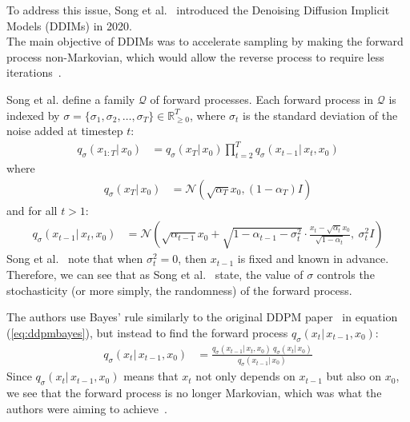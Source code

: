 \documentclass[twoside]{article}
\numberwithin{equation}{section}
\numberwithin{figure}{section}
\begin{document}
To address this issue, Song et al.~\cite{song2022denoising} introduced the Denoising Diffusion Implicit Models (DDIMs) in 2020. \\
The main objective of DDIMs was to accelerate sampling by making the forward process non-Markovian, which would allow the reverse process to require less iterations~\cite{song2022denoising}.

Song et al. \cite{song2022denoising} define a family $\mathcal{Q}$ of forward processes. Each forward process in $\mathcal{Q}$ is indexed by $\sigma  = \{ \sigma_1, \sigma_2, \ldots, \sigma_T \} \in \mathbb{R}^T_{\geq 0}$, where $\sigma_t$ is the standard deviation of the noise added at timestep $t$:
\begin{align}
  q_{\sigma}(x_{1:T}| \, x_0) &= q_{\sigma}(x_T | \, x_0) \prod_{t=2}^{T} q_{\sigma}(x_{t-1}| \, x_t, x_0)
\end{align}
where
\begin{align}
  q_{\sigma}(x_T | \, x_0) &= \mathcal{N}(\sqrt{\alpha_T} x_0, (1 - \alpha_T) I)
\end{align}
and for all $t > 1$:
\begin{align}
  q_{\sigma}(x_{t-1} | \, x_t, x_0) &= \mathcal{N}\left( \sqrt{\alpha_{t-1}} x_0 + \sqrt{1 - \alpha_{t-1} - \sigma_t^2} \cdot \frac{x_t - \sqrt{\alpha_t} x_0}{\sqrt{1 - \alpha_t}}, \: \sigma_t^2 I \right)
\end{align}
Song et al.~\cite{song2022denoising} note that when $\sigma_t^2 = 0$, then $x_{t-1}$ is fixed and known in advance. \\
Therefore, we can see that as Song et al.~\cite{song2022denoising} state, the value of $\sigma$ controls the stochasticity (or more simply, the randomness) of the forward process.

The authors use Bayes' rule similarly to the original DDPM paper~\cite{ho2020denoising} in equation (\ref{eq:ddpmbayes}), but instead to find the forward process $q_\sigma(x_t | \, x_{t-1}, x_0)$:
\begin{align}
  q_{\sigma}(x_t | \, x_{t-1}, x_0) &= \frac{q_\sigma (x_{t-1} | \, x_t, x_0) \: q_\sigma (x_t | \, x_0)}{q_\sigma (x_{t-1} | \, x_0)}
\end{align}
Since $q_\sigma (x_t | \, x_{t-1}, x_0)$ means that $x_t$ not only depends on $x_{t-1}$ but also on $x_0$, we see that the forward process is no longer Markovian, which was what the authors were aiming to achieve~\cite{song2022denoising}.
\end{document}
